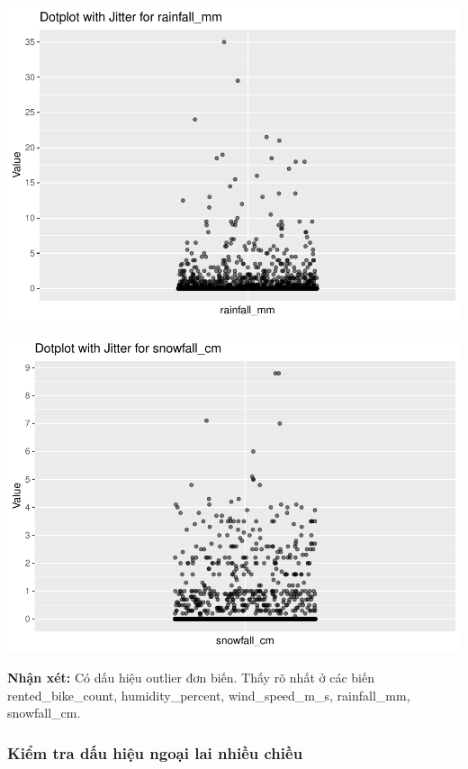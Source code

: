 \documentclass[
  11pt,
  letterpaper,
]{article}
\begin{document}
\begin{center}\includegraphics[width=1.2\linewidth,]{Final_Project_files/figure-latex/Univariate Outlier Check-8} \end{center}

\begin{center}\includegraphics[width=1.2\linewidth,]{Final_Project_files/figure-latex/Univariate Outlier Check-9} \end{center}

\textbf{Nhận xét:} Có dấu hiệu outlier đơn biến. Thấy rõ nhất ở các biến rented\_bike\_count, humidity\_percent, wind\_speed\_m\_s, rainfall\_mm, snowfall\_cm.

\subsubsection{Kiểm tra dấu hiệu ngoại lai nhiều chiều}
\end{document}
